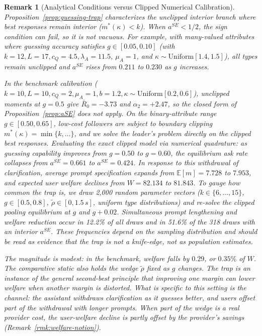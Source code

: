 \documentclass[11pt]{article}
\newtheorem{remark}{Remark}
\begin{document}
\begin{remark}[Analytical Conditions versus Clipped Numerical Calibration]
\label{rmk:guessing-trap-calibration}
Proposition~\ref{prop:guessing-trap} characterizes the unclipped interior branch where best responses remain interior ($m^*(\kappa) < k$). When $a^{SE} < 1/2$, the sign condition can fail, so it is not vacuous. For example, with many-valued attributes where guessing accuracy satisfies $g \in [0.05, 0.10]$ (with $k=12, L=17, c_Q=4.5, \lambda_A=11.5$, $\mu_A = 1$, and $\kappa \sim \text{Uniform}[1.4, 1.5]$), all types remain unclipped and $a^{SE}$ rises from $0.211$ to $0.230$ as $g$ increases.

In the benchmark calibration ($k=10, L=10, c_Q=2, \mu_A = 1, b=1.2, \kappa \sim \text{Uniform}[0.2, 0.6]$), unclipped moments at $g = 0.5$ give $\bar R_0 = -3.73$ and $\alpha_2 = +2.47$, so the closed form of Proposition~\ref{prop:aSE} does not apply. On the binary-attribute range $g \in [0.50, 0.65]$, low-cost followers are subject to boundary clipping $m^*(\kappa) = \min\{k, \dots\}$, and we solve the leader's problem directly on the clipped best responses. Evaluating the exact clipped model via numerical quadrature: as guessing capability improves from $g = 0.50$ to $g = 0.60$, the equilibrium ask rate collapses from $a^{SE} = 0.661$ to $a^{SE} = 0.424$. In response to this withdrawal of clarification, average prompt specification expands from $\mathbb{E}[m] = 7.728$ to $7.953$, and expected user welfare declines from $W = 82.134$ to $81.843$. To gauge how common the trap is, we draw 2{,}000 random parameter vectors ($k \in \{6,\dots,15\}$, $g \in [0.5, 0.8]$, $\tilde\rho \in [0, 1.5\,s]$, uniform type distributions) and re-solve the clipped pooling equilibrium at $g$ and $g + 0.02$. Simultaneous prompt lengthening and welfare reduction occur in 12.2\% of all draws and in 51.6\% of the 318 draws with an interior $a^{SE}$. These frequencies depend on the sampling distribution and should be read as evidence that the trap is not a knife-edge, not as population estimates.

The magnitude is modest: in the benchmark, welfare falls by $0.29$, or $0.35\%$ of $W$. The comparative static also holds the wedge $\tilde\rho$ fixed as $g$ changes. The trap is an instance of the general second-best principle that improving one margin can lower welfare when another margin is distorted. What is specific to this setting is the channel: the assistant withdraws clarification as it guesses better, and users offset part of the withdrawal with longer prompts. When part of the wedge is a real provider cost, the user-welfare decline is partly offset by the provider's savings (Remark~\ref{rmk:welfare-notion}).
\end{remark}
\end{document}
